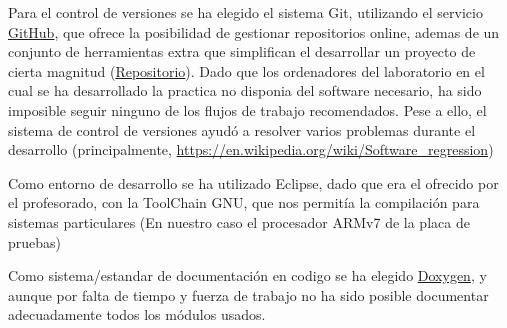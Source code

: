 \documentclass[12pt,letterpaper]{article}
\begin{document}
Para el control de versiones se ha elegido el sistema Git, utilizando
el servicio \href{https://www.github.com}{GitHub}, que ofrece la
posibilidad de gestionar repositorios online, ademas de un conjunto de
herramientas extra que simplifican el desarrollar un proyecto de
cierta magnitud
(\href{https://www.github.com/wynro/proyecto\_hardware}{Repositorio}). Dado
que los ordenadores del laboratorio en el cual se ha desarrollado la
practica no disponia del software necesario, ha sido imposible seguir
ninguno de los flujos de trabajo recomendados. Pese a ello, el sistema
de control de versiones ayudó a resolver varios problemas durante el
desarrollo (principalmente, \href{regresiones de
  software}{https://en.wikipedia.org/wiki/Software\_regression})

Como entorno de desarrollo se ha utilizado Eclipse, dado que era el
ofrecido por el profesorado, con la ToolChain GNU, que nos permitía la
compilación para sistemas particulares (En nuestro caso el procesador
ARMv7 de la placa de pruebas)

Como sistema/estandar de documentación en codigo se ha elegido
\href{http://www.stack.nl/~dimitri/doxygen/}{Doxygen}, y aunque por
falta de tiempo y fuerza de trabajo no ha sido posible documentar
adecuadamente todos los módulos usados.
\end{document}
